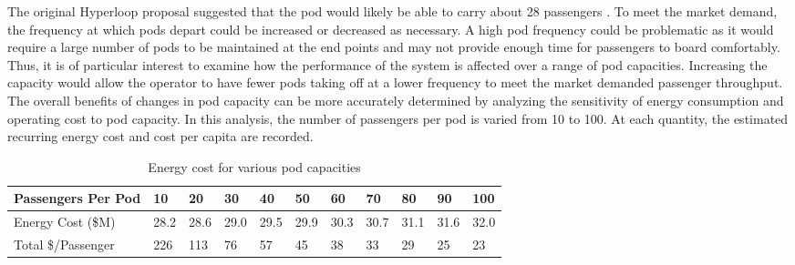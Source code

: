 The original Hyperloop proposal suggested
that the pod would likely be able to carry about 28 passengers \cite{Musk}.
To meet the market demand, the frequency at which pods depart could be
increased or decreased as necessary. A high pod frequency could be
problematic as it would require a large number of pods to be maintained at
the end points and may not provide enough time for passengers to board comfortably.
Thus, it is of particular interest to examine how the performance of the system
is affected over a range of pod capacities. Increasing the capacity would allow
the operator to have fewer pods taking off at a lower frequency to meet
the market demanded passenger throughput. The overall benefits of
changes in pod capacity can be more accurately determined by analyzing the
sensitivity of energy consumption and operating cost to pod capacity.
In this analysis, the number of passengers per pod is varied from 10 to 100.
At each quantity, the estimated recurring energy cost and cost per capita are recorded.
\begin{table}
    \begin{center}
        \begin{tabular}{| l | l | l | l | l | l | l | l | l | l | l |}
        \hline
        Passengers Per Pod & 10 & 20 & 30 & 40 & 50 & 60 & 70 & 80 & 90 & 100 \\ \hline
        Energy Cost (\$M) & 28.2 & 28.6 & 29.0 & 29.5 & 29.9 & 30.3 & 30.7 & 31.1 & 31.6 & 32.0 \\ \hline
        Total \$/Passenger & 226 & 113 & 76 & 57 & 45 & 38 & 33 & 29 & 25 & 23 \\ \hline
        \end{tabular}
        \caption{Energy cost for various pod capacities}
        \label{tab:energy_cost_vs_passengers}
    \end{center}
\end{table}

